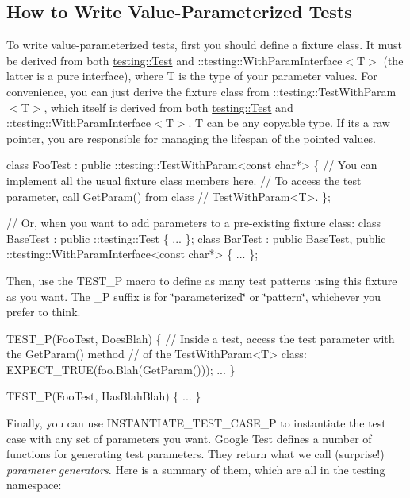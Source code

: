 \subsection*{How to Write Value-\/\+Parameterized Tests}

To write value-\/parameterized tests, first you should define a fixture class. It must be derived from both {\ttfamily \hyperlink{classtesting_1_1_test}{testing\+::\+Test}} and {\ttfamily \+::testing\+::\+With\+Param\+Interface$<$T$>$} (the latter is a pure interface), where {\ttfamily T} is the type of your parameter values. For convenience, you can just derive the fixture class from {\ttfamily \+::testing\+::\+Test\+With\+Param$<$T$>$}, which itself is derived from both {\ttfamily \hyperlink{classtesting_1_1_test}{testing\+::\+Test}} and {\ttfamily \+::testing\+::\+With\+Param\+Interface$<$T$>$}. {\ttfamily T} can be any copyable type. If it\textquotesingle{}s a raw pointer, you are responsible for managing the lifespan of the pointed values.


\begin{DoxyCode}
class FooTest : public ::testing::TestWithParam<const char*> \{
  // You can implement all the usual fixture class members here.
  // To access the test parameter, call GetParam() from class
  // TestWithParam<T>.
\};

// Or, when you want to add parameters to a pre-existing fixture class:
class BaseTest : public ::testing::Test \{
  ...
\};
class BarTest : public BaseTest,
                public ::testing::WithParamInterface<const char*> \{
  ...
\};
\end{DoxyCode}


Then, use the {\ttfamily T\+E\+S\+T\+\_\+P} macro to define as many test patterns using this fixture as you want. The {\ttfamily \+\_\+P} suffix is for \char`\"{}parameterized\char`\"{} or \char`\"{}pattern\char`\"{}, whichever you prefer to think.


\begin{DoxyCode}
TEST\_P(FooTest, DoesBlah) \{
  // Inside a test, access the test parameter with the GetParam() method
  // of the TestWithParam<T> class:
  EXPECT\_TRUE(foo.Blah(GetParam()));
  ...
\}

TEST\_P(FooTest, HasBlahBlah) \{
  ...
\}
\end{DoxyCode}


Finally, you can use {\ttfamily I\+N\+S\+T\+A\+N\+T\+I\+A\+T\+E\+\_\+\+T\+E\+S\+T\+\_\+\+C\+A\+S\+E\+\_\+P} to instantiate the test case with any set of parameters you want. Google Test defines a number of functions for generating test parameters. They return what we call (surprise!) {\itshape parameter generators}. Here is a summary of them, which are all in the {\ttfamily testing} namespace\+:

